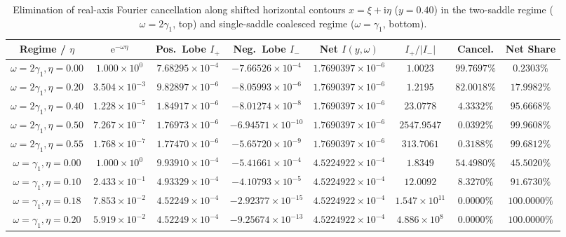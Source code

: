 \documentclass[11pt,a4paper,reqno]{amsart}
\theoremstyle{definition}
\theoremstyle{remark}
\numberwithin{equation}{section}
\newcommand{\ii}{\mathrm{i}}
\newcommand{\ee}{\mathrm{e}}
\begin{document}
\begin{table}[htbp]
\centering
\caption{Elimination of real-axis Fourier cancellation along shifted horizontal contours $x = \xi + \ii\eta$ ($y = 0.40$) in the two-saddle regime ($\omega = 2\gamma_1$, top) and single-saddle coalesced regime ($\omega = \gamma_1$, bottom).}\label{tab:cancellation_collapse}
\scriptsize
\setlength{\tabcolsep}{1.8pt}
\begin{tabular}{cccccccc}
\toprule
\textbf{Regime / $\eta$} & \textbf{$\ee^{-\omega\eta}$} & \textbf{Pos.\ Lobe $I_+$} & \textbf{Neg.\ Lobe $I_-$} & \textbf{Net $I(y,\omega)$} & \textbf{$I_+ / |I_-|$} & \textbf{Cancel.} & \textbf{Net Share} \\
\midrule
$\omega=2\gamma_1, \eta=0.00$ & $1.000 \times 10^{0}$  & $7.68295 \times 10^{-4}$ & $-7.66526 \times 10^{-4}$ & $1.7690397 \times 10^{-6}$ & $1.0023$    & $99.7697\%$ & $0.2303\%$ \\
$\omega=2\gamma_1, \eta=0.20$ & $3.504 \times 10^{-3}$ & $9.82897 \times 10^{-6}$ & $-8.05993 \times 10^{-6}$ & $1.7690397 \times 10^{-6}$ & $1.2195$    & $82.0018\%$ & $17.9982\%$ \\
$\omega=2\gamma_1, \eta=0.40$ & $1.228 \times 10^{-5}$ & $1.84917 \times 10^{-6}$ & $-8.01274 \times 10^{-8}$ & $1.7690397 \times 10^{-6}$ & $23.0778$   & $4.3332\%$  & $95.6668\%$ \\
$\omega=2\gamma_1, \eta=0.50$ & $7.267 \times 10^{-7}$ & $1.76973 \times 10^{-6}$ & $-6.94571 \times 10^{-10}$ & $1.7690397 \times 10^{-6}$ & $2547.9547$ & $0.0392\%$  & $99.9608\%$ \\
$\omega=2\gamma_1, \eta=0.55$ & $1.768 \times 10^{-7}$ & $1.77470 \times 10^{-6}$ & $-5.65720 \times 10^{-9}$ & $1.7690397 \times 10^{-6}$ & $313.7061$  & $0.3188\%$  & $99.6812\%$ \\
\midrule
$\omega=\gamma_1, \eta=0.00$  & $1.000 \times 10^{0}$  & $9.93910 \times 10^{-4}$ & $-5.41661 \times 10^{-4}$ & $4.5224922 \times 10^{-4}$ & $1.8349$    & $54.4980\%$ & $45.5020\%$ \\
$\omega=\gamma_1, \eta=0.10$  & $2.433 \times 10^{-1}$ & $4.93329 \times 10^{-4}$ & $-4.10793 \times 10^{-5}$ & $4.5224922 \times 10^{-4}$ & $12.0092$   & $8.3270\%$  & $91.6730\%$ \\
$\omega=\gamma_1, \eta=0.18$  & $7.853 \times 10^{-2}$ & $4.52249 \times 10^{-4}$ & $-2.92377 \times 10^{-15}$ & $4.5224922 \times 10^{-4}$ & $1.547 \times 10^{11}$ & $0.0000\%$ & $100.0000\%$ \\
$\omega=\gamma_1, \eta=0.20$  & $5.919 \times 10^{-2}$ & $4.52249 \times 10^{-4}$ & $-9.25674 \times 10^{-13}$ & $4.5224922 \times 10^{-4}$ & $4.886 \times 10^{8}$  & $0.0000\%$ & $100.0000\%$ \\
\bottomrule
\end{tabular}
\end{table}
\end{document}
